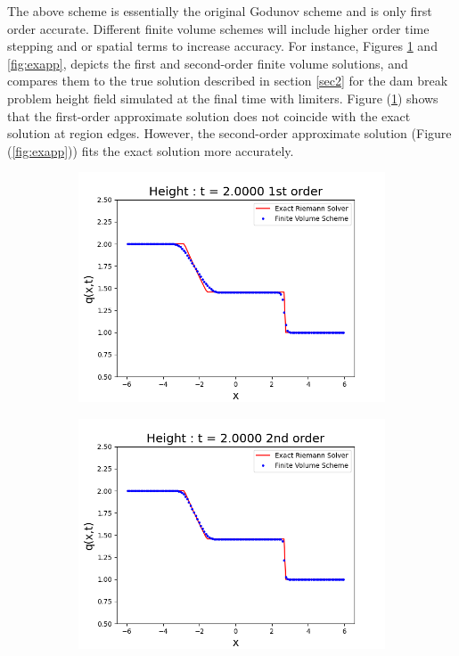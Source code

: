 \documentclass[10pt,a4paper]{article}
\newcommand{\Fig}[1]{Figure (\ref{fig:#1})}
\begin{document}
	The above  scheme is essentially the original Godunov scheme  \citep{godunov1959difference} and is only first order accurate.  Different finite volume schemes will include higher order time stepping and or spatial terms to increase accuracy.  For instance, Figures \ref{fig:exap} and \ref{fig:exapp}, depicts the first and second-order finite volume solutions, and compares them to the true solution described in section \ref{sec2} for the dam break problem height field simulated at the final time with limiters. \Fig{exap}  shows that the first-order approximate solution does not coincide with the exact solution at region edges. However, the second-order approximate solution (\Fig{exapp})  fits the exact solution more accurately. 
	\begin{figure}[H]
		\begin{subfigure}[b]{0.5\textwidth}
			\centering
			\includegraphics[width=1.0\linewidth]{images/exap}
			\caption{}
			\label{fig:exap}
		\end{subfigure}
		\begin{subfigure}[b]{0.5\textwidth}
			\centering
			\includegraphics[width=1.0\linewidth]{images/exapp}

\end{subfigure}
\end{figure}
\end{document}
